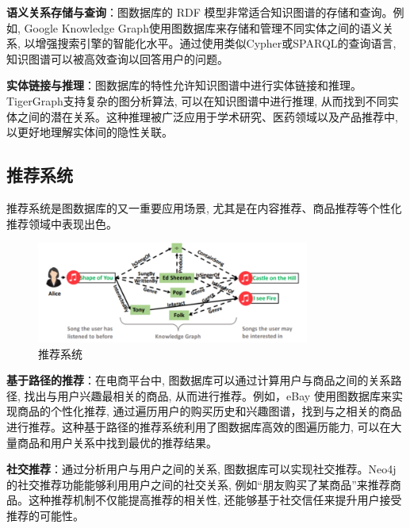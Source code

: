 \textbf{语义关系存储与查询}：图数据库的 RDF 模型非常适合知识图谱的存储和查询。例如, Google Knowledge Graph使用图数据库来存储和管理不同实体之间的语义关系, 以增强搜索引擎的智能化水平。通过使用类似Cypher或SPARQL的查询语言, 知识图谱可以被高效查询以回答用户的问题\cite{dong2014knowledge}。

\textbf{实体链接与推理}：图数据库的特性允许知识图谱中进行实体链接和推理。TigerGraph支持复杂的图分析算法, 可以在知识图谱中进行推理, 从而找到不同实体之间的潜在关系。这种推理被广泛应用于学术研究、医药领域以及产品推荐中, 以更好地理解实体间的隐性关联\cite{徐增林2016知识图谱技术综述}。


\subsection{推荐系统}
推荐系统是图数据库的又一重要应用场景, 尤其是在内容推荐、商品推荐等个性化推荐领域中表现出色\cite{秦川2020基于知识图谱的推荐系统研究综述,刘佳玮2021基于异质信息网络的推荐系统研究综述}。
\begin{figure}
    \centering
    \includegraphics[width=0.8\textwidth]{images/22.png}
    \caption{推荐系统}
    \label{fig:22}
\end{figure}

\textbf{基于路径的推荐}：在电商平台中, 图数据库可以通过计算用户与商品之间的关系路径, 找出与用户兴趣最相关的商品, 从而进行推荐。例如，eBay 使用图数据库来实现商品的个性化推荐, 通过遍历用户的购买历史和兴趣图谱，找到与之相关的商品进行推荐。这种基于路径的推荐系统利用了图数据库高效的图遍历能力, 可以在大量商品和用户关系中找到最优的推荐结果\cite{fayyaz2020recommendation,wu2022graph,赵俊逸2021协同过滤推荐系统综述}。

\textbf{社交推荐}：通过分析用户与用户之间的关系, 图数据库可以实现社交推荐。Neo4j的社交推荐功能能够利用用户之间的社交关系, 例如“朋友购买了某商品”来推荐商品。这种推荐机制不仅能提高推荐的相关性, 还能够基于社交信任来提升用户接受推荐的可能性\cite{fayyaz2020recommendation,赵俊逸2021协同过滤推荐系统综述}。


